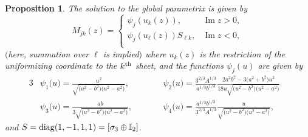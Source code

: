 \documentclass[10pt,a4paper]{amsart}
\numberwithin{equation}{section}
\newtheorem{Proposition}[Theorem]{Proposition}
 { \theoremstyle{definition}
\newtheorem{Definition}[Theorem]{Definition}
\newtheorem{Note}[Theorem]{Note}
\newtheorem{Example}[Theorem]{Example}
\newtheorem{Remark}[Theorem]{Remark} }
\begin{document}
 \begin{Proposition}
 The solution to the global parametrix is given by
 \begin{equation*}
 M_{jk}(z) = \begin{cases}
 \psi_j(u_k(z)), & \operatorname{Im} z >0,\\
 \psi_j(u_\ell(z))S_{\ell k}, & \operatorname{Im} z <0,\\
 \end{cases}
 \end{equation*}
 $($here, summation over $\ell$ is implied$)$ where $u_k(z)$ is the restriction of the uniformizing coordinate to the $k^{\rm th}$ sheet, and the functions $\psi_j(u)$ are given by
 \begin{alignat*}{3}
 &\psi_1\bigl(u\bigr) = \frac{u^2}{\sqrt{\bigl(u^2-b^2\bigr)\bigl(u^2-a^2\bigr)}}, \qquad && \psi_2\bigl(u\bigr) = \frac{3^{2/3}A^{1/3}}{a^{1/3}b^{1/3} }\frac{2a^2b^2-3\bigl(a^2+b^2\bigr)u^2}{18u\sqrt{\bigl(u^2-b^2\bigr)\bigl(u^2-a^2\bigr)}}& \\
 &\psi_3\bigl(u\bigr) = \frac{ab}{3\sqrt{\bigl(u^2-b^2\bigr)\bigl(u^2-a^2\bigr)}}, \qquad && \psi_4\bigl(u\bigr) = \frac{a^{1/3}b^{1/3} }{3^{2/3}A^{1/3} }\frac{u}{\sqrt{\bigl(u^2-b^2\bigr)\bigl(u^2-a^2\bigr)}},&
 \end{alignat*}
 and $S = {\rm diag}(1, -1, 1, 1) = [\sigma_3 \oplus \mathbb{I}_2]$.
 \end{Proposition}
\end{document}
